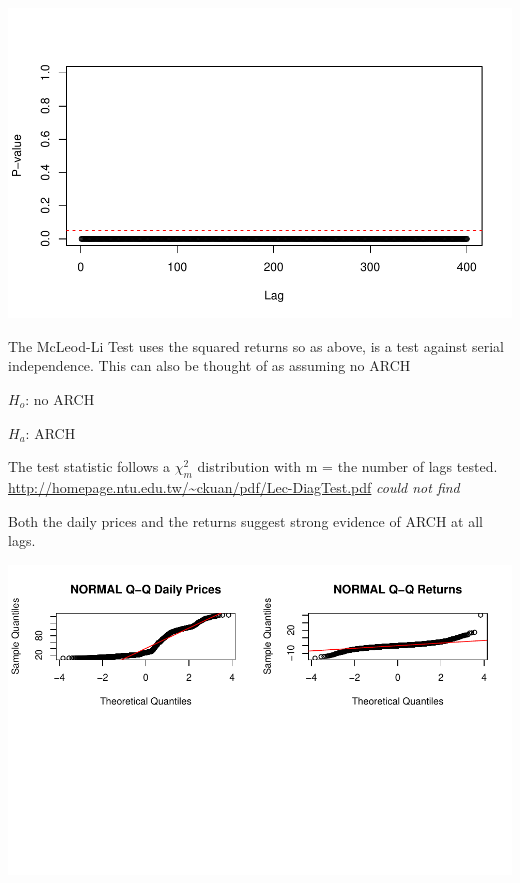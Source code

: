 \documentclass[11pt]{article}\usepackage[]{graphicx}\usepackage[]{color}
\makeatletter
\def\maxwidth{ %
  \ifdim\Gin@nat@width>\linewidth
    \linewidth
  \else
    \Gin@nat@width
  \fi
}
\newenvironment{knitrout}{}{} %
\makeatother
\begin{document}
\begin{knitrout}\footnotesize
{}\color{fgcolor}

{\centering \includegraphics[width=\maxwidth]{figure/mli-1} 

}



\end{knitrout}

The McLeod-Li Test uses the squared returns so as above, is a test against serial independence. This can also be thought of as assuming no ARCH 

$H_{o}$: no ARCH

$H_{a}$: ARCH

The test statistic follows a $\chi^{2}_{m}$ distribution with m = the number of lags tested. \url{http://homepage.ntu.edu.tw/~ckuan/pdf/Lec-DiagTest.pdf} {\it could not find }

Both the daily prices and the returns suggest strong evidence of ARCH at all lags.

\begin{knitrout}\footnotesize
{}\color{fgcolor}

{\centering \includegraphics[width=\maxwidth]{figure/norm-1} 

}



\end{knitrout}
\end{document}
